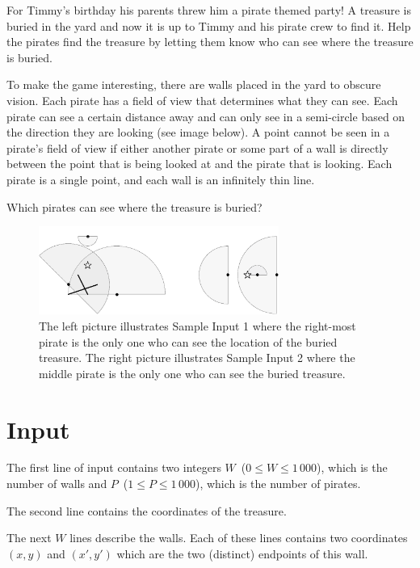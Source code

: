 For Timmy's birthday his parents threw him a pirate themed party! A treasure is buried in the yard and now it is up to Timmy and his pirate crew to find it. Help the pirates find the treasure by letting them know who can see where the treasure is buried.

To make the game interesting, there are walls placed in the yard to
obscure vision. Each pirate has a field of view that determines what
they can see. Each pirate can see a certain distance away and can only
see in a semi-circle based on the direction they are looking (see
image below). A point cannot be seen in a pirate's field of view if
either another pirate or some part of a wall is directly between the
point that is being looked at and the pirate that is looking.  Each
pirate is a single point, and each wall is an infinitely thin line.

Which pirates can see where the treasure is buried?

\begin{figure}[h]
\begin{center}
 \includegraphics[width=0.7\textwidth]{sample.pdf}
 \caption{The left picture illustrates Sample Input 1 where the right-most pirate is the only one who can see the location of the buried treasure. The right picture illustrates Sample Input 2 where the middle pirate is the only one who can see the buried treasure.}
\end{center}
\end{figure}

\section*{Input}

The first line of input contains two integers $W$~($0 \leq W \leq 1 \, 000$), which is the number of walls and $P$~($1 \leq P \leq 1 \, 000$), which is the number of pirates.

The second line contains the coordinates of the treasure.

The next $W$ lines describe the walls. Each of these lines contains two coordinates $(x,y)$ and $(x',y')$ which are the two (distinct) endpoints of this wall.

